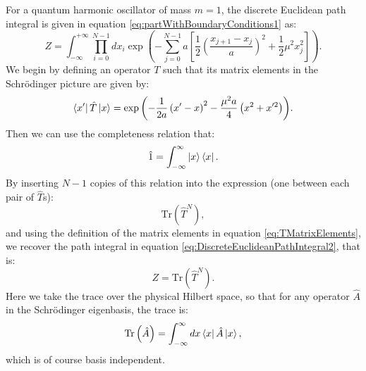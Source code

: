 \documentclass[12pt]{article}
\begin{document}
        For a quantum harmonic oscillator of mass $m=1$, the discrete Euclidean path integral is given in equation \ref{eq:partWithBoundaryConditions1} as:
        \begin{equation}
            \label{eq:DiscreteEuclideanPathIntegral2}
            Z = \int^{+\infty}_{-\infty}\prod_{i=0}^{N-1}dx_i \exp{\left(-\sum^{N-1}_{j=0} a \left[\frac{1}{2}\left(\frac{x_{j+1}-x_j}{a}\right)^2+\frac{1}{2}\mu^2x_{j}^2\right]\right)}.
        \end{equation}
        We begin by defining an operator $T$ such that its matrix elements in the Schr{\"o}dinger picture are given by:
        \begin{equation}
            \label{eq:TMatrixElements}
            \bra{x'}\hat{T}\ket{x} = \exp{\left(-\frac{1}{2a}\left(x'-x\right)^2-\frac{\mu^2a}{4}\left(x^2+x'^2\right)\right)}.
        \end{equation}
        Then we can use the completeness relation that:
        \begin{equation}
            \label{eq:CompletenessRelation}
            \hat{1} = \int_{-\infty}^{\infty}\ket{x}\bra{x}.
        \end{equation}
        By inserting $N-1$ copies of this relation into the expression (one between each pair of $\hat{T}$s):
        \begin{equation}
            \label{eq:TraceT}
            \text{Tr}\left(\hat{T}^{N}\right),
        \end{equation}
        and using the definition of the matrix elements in equation \ref{eq:TMatrixElements}, we recover the path integral in equation \ref{eq:DiscreteEuclideanPathIntegral2}, that is:
        \begin{equation}
            \label{eq:PathIntegralAsTrace}
            Z = \text{Tr}\left(\hat{T}^N\right).
        \end{equation}
        Here we take the trace over the physical Hilbert space, so that for any operator $\hat{A}$ in the Schr{\"o}dinger eigenbasis, the trace is:
        \begin{equation}
            \label{eq:Trace}
            \text{Tr}\left(\hat{A}\right) = \int_{-\infty}^{\infty}dx\bra{x}\hat{A}\ket{x},
        \end{equation}
        which is of course basis independent.
\end{document}
